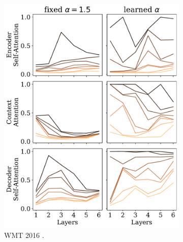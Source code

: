 \begin{figure}[!htbp]
    \centering
    \begin{subfigure}[b]{.49\linewidth}
        \includegraphics[width=\linewidth]{Figures/head_density_per_layer_ro.pdf}
        \caption{%
            \label{fig:head_density_per_layer_ro}%
            WMT 2016 .}
    \end{subfigure}
    \begin{subfigure}[b]{.49\linewidth}

\end{subfigure}
\end{figure}
